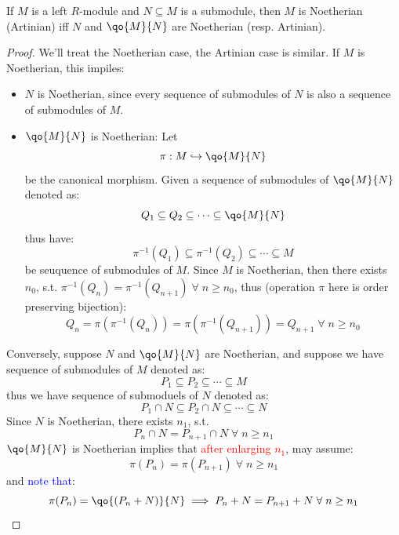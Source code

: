 \begin{proposition}
	\label{prop:noeth-module}
	If \( M \) is a left \( R \)-module and \( N \subseteq M \) is a submodule, then \( M \) is
	Noetherian (Artinian) iff \( N \) and \( \qo{M}{N} \) are Noetherian (resp. Artinian).
\end{proposition}

\begin{proof}
	We'll treat the Noetherian case, the Artinian case is similar. If \( M \) is Noetherian, this
	impiles:
	\begin{itemize}
		\item \( N \) is Noetherian, since every sequence of submodules of \( N \) is also a sequence of
		      submodules of \( M \).
		\item \( \qo{M}{N} \) is Noetherian: Let
		      \[
			      \pi : M \hookrightarrow \qo{M}{N}
		      \]
		      be the canonical morphism. Given a sequence of submodules of \( \qo{M}{N} \) denoted as:
		      \[
			      Q_1 \subseteq Q_2 \subseteq \cdots \subseteq \qo{M}{N}
		      \]
		      thus have:
		      \[
			      \pi^{-1} (Q_1) \subseteq \pi^{-1} (Q_2) \subseteq \cdots \subseteq M
		      \]
		      be seuquence of submodules of \( M \). Since \( M \) is Noetherian, then there exists \(
		      n_0 \), s.t. \( \pi^{-1}(Q_n) = \pi^{-1}(Q_{n+1}) \; \forall \; n \geq n_0 \), thus
		      (operation \( \pi \) here is order preserving bijection):
		      \[
			      Q_n = \pi (\pi^{-1} (Q_n)) = \pi (\pi^{-1} (Q_{n+1})) = Q_{n+1} \; \forall \; n \geq n_0
		      \]
	\end{itemize}
	Conversely, suppose \( N \) and \( \qo{M}{N} \) are Noetherian, and suppose we have sequence of
	submodules of \( M \) denoted as:
	\[
		P_1 \subseteq P_2 \subseteq \cdots \subseteq M
	\]
	thus we have sequence of submoduels of \( N \) denoted as:
	\[
		P_1 \cap N \subseteq P_2 \cap N \subseteq \cdots \subseteq N
	\]
	Since \( N \) is Noetherian, there exists \( n_1 \), s.t.
	\begin{equation}
		\label{eq:noeth-module-1}
		P_n \cap N = P_{n+1} \cap N \;
		\forall \; n \geq n_1
	\end{equation}
	\( \qo{M}{N} \) is Noetherian implies that \textcolor{red}{after enlarging \( n_1 \)}, may assume:
	\[
		\pi(P_n) = \pi(P_{n+1}) \; \forall \; n \geq n_1
	\]
	and \textcolor{blue}{note that}:
	\begin{equation}
		\label{eq:noeth-module-2}
		\pi(P_n) = \qo{(P_n + N)}{N} \implies P_n + N = P_{n+1} + N \; \forall \; n \geq n_1
	\end{equation}

\end{proof}
